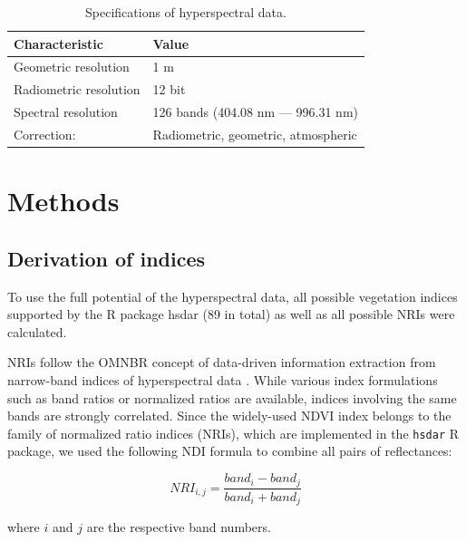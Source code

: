 \documentclass[final]{IEEEtran}
\begin{document}

\begin{table}[t]
	\centering
	\caption[t]{Specifications of hyperspectral data.}
	\begingroup
	\begin{tabular}{ll}
		\\
		Characteristic         & Value                               \\
		\toprule
		Geometric resolution   & 1 m                                 \\
		Radiometric resolution & 12 bit                              \\
		Spectral resolution    & 126 bands (404.08 nm --- 996.31 nm) \\
		Correction:            & Radiometric, geometric, atmospheric
	\end{tabular}
	\endgroup\label{tab:hyperparameter_metadata}
\end{table}

\section{Methods}

\subsection{Derivation of indices}

To use the full potential of the hyperspectral data, all possible vegetation indices supported by the R package hsdar (89 in total) as well as all possible \ac{NRI}s were calculated.

NRIs follow the \ac{OMNBR} concept of data-driven information extraction from narrow-band indices of hyperspectral data \cite{thenkabail2000,thenkabail2018}.
While various index formulations such as band ratios or normalized ratios are available, indices involving the same bands are strongly correlated.
Since the widely-used NDVI index belongs to the family of normalized ratio indices (NRIs), which are implemented in the \texttt{hsdar} R package, we used the following NDI formula to combine all pairs of reflectances:

\begin{equation}
	NRI_{i,j} = \frac{band_{i} - band_{j}}{band_{i} + band_{j}}
\end{equation}

\noindent
where \(i\) and \(j\) are the respective band numbers.

\bigbreak{}
\end{document}
